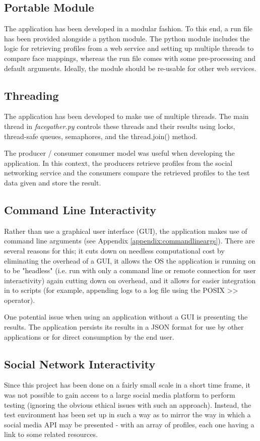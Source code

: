 \documentclass{article}
\begin{document}
\subsection{Portable Module}
The application has been developed in a modular fashion. To this end, a run file has been provided alongside a python module. The python module includes the logic for retrieving profiles from a web service and setting up multiple threads to compare face mappings, whereas the run file comes with some pre-processing and default arguments. Ideally, the module should be re-usable for other web services.

\subsection{Threading}
The application has been developed to make use of multiple threads. The main thread in \textit{facegather.py} controls these threads and their results using locks, thread-safe queues, semaphores, and the thread.join() method.

The producer / consumer consumer model was useful when developing the application. In this context, the producers retrieve profiles from the social networking service and the consumers compare the retrieved profiles to the test data given and store the result.

\subsection{Command Line Interactivity}
Rather than use a graphical user interface (GUI), the application makes use of command line arguments (see Appendix \ref{appendix:commandlineargs}). There are several reasons for this; it cuts down on needless computational cost by eliminating the overhead of a GUI, it allows the OS the application is running on to be "headless" (i.e. run with only a command line or remote connection for user interactivity) again cutting down on overhead, and it allows for easier integration in to scripts (for example, appending logs to a log file using the POSIX >> operator).

One potential issue when using an application without a GUI is presenting the results. The application persists its results in a JSON format for use by other applications or for direct consumption by the end user. 

\subsection{Social Network Interactivity}
Since this project has been done on a fairly small scale in a short time frame, it was not possible to gain access to a large social media platform to perform testing (ignoring the obvious ethical issues with such an approach). Instead, the test environment has been set up in such a way as to mirror the way in which a social media API may be presented - with an array of profiles, each one having a link to some related resources.
\end{document}
